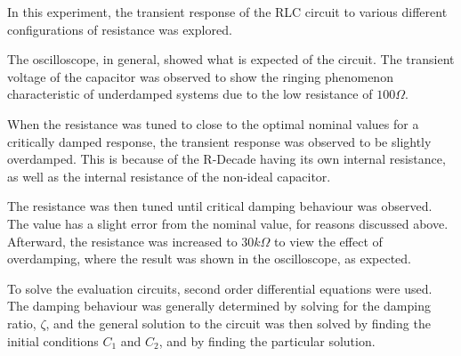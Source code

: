 In this experiment, the transient response of the RLC circuit to various different configurations of resistance was explored.

The oscilloscope, in general, showed what is expected of the circuit. The transient voltage of the capacitor was observed to show the ringing phenomenon characteristic of underdamped systems due to the low resistance of $100\Omega$.

When the resistance was tuned to close to the optimal nominal values for a critically damped response, the transient response was observed to be slightly overdamped. This is because of the R-Decade having its own internal resistance, as well as the internal resistance of the non-ideal capacitor.

The resistance was then tuned until critical damping behaviour was observed. The value has a slight error from the nominal value, for reasons discussed above. Afterward, the resistance was increased to $30k\Omega$ to view the effect of overdamping, where the result was shown in the oscilloscope, as expected.

To solve the evaluation circuits, second order differential equations were used. The damping behaviour was generally determined by solving for the damping ratio, $\zeta$, and the general solution to the circuit was then solved by finding the initial conditions $C_1$ and $C_2$, and by finding the particular solution.